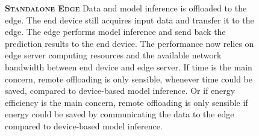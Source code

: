 \begin{figure}
	\begin{minipage}{0.3\linewidth}
		\centering
		\begin{figure}
			\centering
			\captionsetup[subfigure]{justification=centering}
		\end{figure}
	\end{minipage}
	\hfill
	\begin{minipage}{0.65\linewidth}
		\textbf{\protect{} \textsc{Standalone Edge}}
		\color{caption-color} \newline
		Data and model inference is offloaded to the edge. The end device still acquires input data and transfer it to the edge. The edge performs model inference and send back the prediction results to the end device. The performance now relies on edge server computing resources and the available network bandwidth between end device and edge server. If time is the main concern, remote offloading is only sensible, whenever time could be saved, compared to device-based model inference. Or if energy efficiency is the main concern, remote offloading is only sensible if energy could be saved by communicating the data to the edge compared to device-based model inference.
	\end{minipage}
\end{figure}

